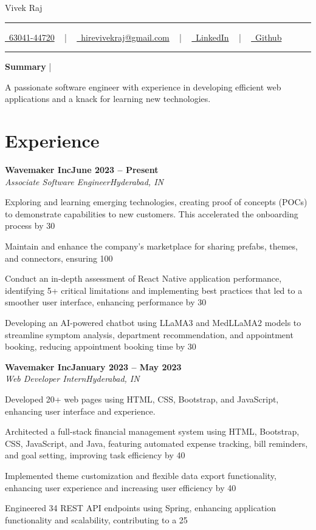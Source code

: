 \documentclass[letterpaper,10pt]{article}
\newcommand{\documentTitle}[2]{
  \begin{center}
    {\Huge\color{accentTitle} #1}
    \vspace{10pt}
    {\color{accentLine} \hrule}
    \vspace{2pt}
    \footnotesize{#2}
    \vspace{2pt}
    {\color{accentLine} \hrule}
  \end{center}
}
\newcommand{\tinysection}[1]{
  \phantomsection
  \addcontentsline{toc}{section}{#1}
  {\large{\bfseries\color{accentText}#1} {\color{accentLine} |}}
}
\newcommand{\heading}[2]{
  \hspace{10pt}#1\hfill#2\\
}
\newcommand{\headingBf}[2]{
  \heading{\textbf{#1}}{\textbf{#2}}
}
\newcommand{\headingIt}[2]{
  \heading{\textit{#1}}{\textit{#2}}
}
\newenvironment{resume_list}{
  \vspace{-7pt}
  \begin{itemize}[itemsep=-2px, parsep=1pt, leftmargin=30pt]
}{
  \end{itemize}
}
\begin{document}
  \documentTitle{Vivek Raj}{
    \href{tel:6304144730}{
      \raisebox{-0.05\height} \faPhone\ 63041-44720} ~ | ~
    \href{mailto:hirevivekraj@gmail.com}{
      \raisebox{-0.15\height} \faEnvelope\ hirevivekraj@gmail.com} ~ | ~
    \href{https://linkedin.com/in/USER/}{
      \raisebox{-0.15\height} \faLinkedin\ LinkedIn} ~ | ~
    \href{https://github.com/USER}{
      \raisebox{-0.15\height} \faGithub\ Github}
  }
  \tinysection{Summary}
  A passionate software engineer with experience in developing efficient web applications and a knack for learning new technologies.
  \section{Experience}
  \headingBf{Wavemaker Inc}{June 2023 – Present}
  \headingIt{Associate Software Engineer}{Hyderabad, IN}
  \begin{resume_list}
    \item Exploring and learning emerging technologies, creating proof of concepts (POCs) to demonstrate capabilities to new customers.  This accelerated the onboarding process by 30%
    \item Maintain and enhance the company’s marketplace for sharing prefabs, themes, and connectors, ensuring 100%
    \item Conduct an in-depth assessment of React Native application performance, identifying 5+ critical limitations and implementing best practices that led to a smoother user interface, enhancing performance by 30%
    \item Developing an AI-powered chatbot using LLaMA3 and MedLLaMA2 models to streamline symptom analysis, department recommendation, and appointment booking, reducing appointment booking time by 30%
  \end{resume_list}
  \headingBf{Wavemaker Inc}{January 2023 – May 2023}
  \headingIt{Web Developer Intern}{Hyderabad, IN}
  \begin{resume_list}
    \item Developed 20+ web pages using HTML, CSS, Bootstrap, and JavaScript, enhancing user interface and experience.
    \item Architected a full-stack financial management system using HTML, Bootstrap, CSS, JavaScript, and Java, featuring automated expense tracking, bill reminders, and goal setting, improving task efficiency by 40%
    \item Implemented theme customization and flexible data export functionality, enhancing user experience and increasing user efficiency by 40%
    \item Engineered 34 REST API endpoints using Spring, enhancing application functionality and scalability, contributing to a 25%
  \end{resume_list}
\end{document}
